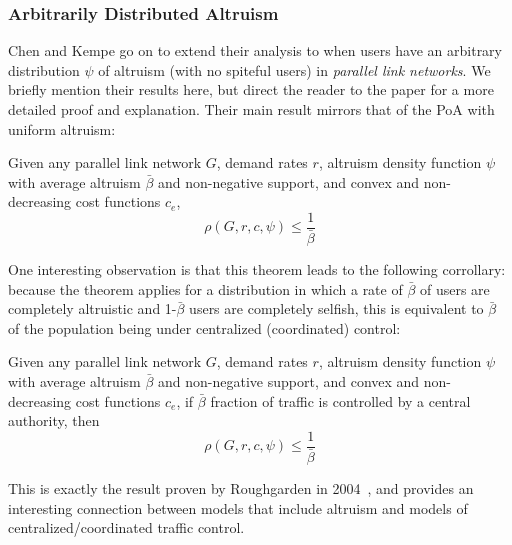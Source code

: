 \subsubsection{Arbitrarily Distributed Altruism}
Chen and Kempe go on to extend their analysis to when users have an arbitrary distribution $\psi$ of altruism (with no spiteful users) in \emph{parallel link networks}. We briefly mention their results here, but direct the reader to the paper for a more detailed proof and explanation. 
Their main result mirrors that of the PoA with uniform altruism:
\begin{theorem}
Given any parallel link network $G$, demand rates $r$, altruism density function $\psi$ with average altruism $\bar{\beta}$ and non-negative support, and convex and non-decreasing cost functions $c_e$,
   $$\rho(G,r,c,\psi) \le \frac{1}{\bar{\beta}}$$
\end{theorem}
One interesting observation is that this theorem leads to the following corrollary: because the theorem applies for a distribution in which a rate of $\bar{\beta}$ of users are completely altruistic and 1-$\bar{\beta}$ users are completely selfish, this is equivalent to $\bar{\beta}$ of the population being under centralized (coordinated) control:
\begin{corollary}
Given any parallel link network $G$, demand rates $r$, altruism density function $\psi$ with average altruism $\bar{\beta}$ and non-negative support, and convex and non-decreasing cost functions $c_e$,
if $\bar{\beta}$ fraction of traffic is controlled by a central authority, then
   $$\rho(G,r,c,\psi) \le \frac{1}{\bar{\beta}}$$
\end{corollary}
This is exactly the result proven by Roughgarden in 2004~\cite{roughgarden04}, and provides an interesting connection between models that include altruism and models of centralized/coordinated traffic control.
